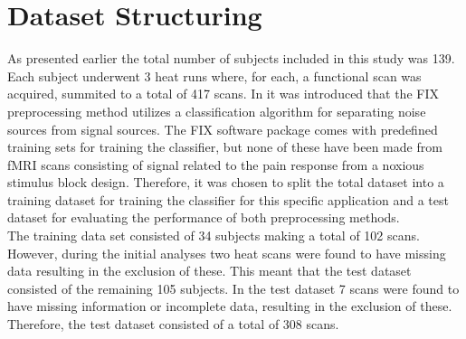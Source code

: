 \section{Dataset Structuring}

As presented earlier the total number of subjects included in this study was 139. Each subject underwent 3 heat runs where, for each, a functional scan was acquired, summited to a total of 417 scans. In  it was introduced that the FIX preprocessing method utilizes a classification algorithm for separating noise sources from signal sources. The FIX software package comes with predefined training sets for training the classifier, but none of these have been made from fMRI scans consisting of signal related to the pain response from a noxious stimulus block design. Therefore, it was chosen to split the total dataset into a training dataset for training the classifier for this specific application and a test dataset for evaluating the performance of both preprocessing methods. \\
The training data set consisted of 34 subjects making a total of 102 scans. However, during the initial analyses two heat scans were found to have missing data resulting in the exclusion of these. This meant that the test dataset consisted of the remaining 105 subjects. In the test dataset 7 scans were found to have missing information or incomplete data, resulting in the exclusion of these. Therefore, the test dataset consisted of a total of 308 scans.  

 